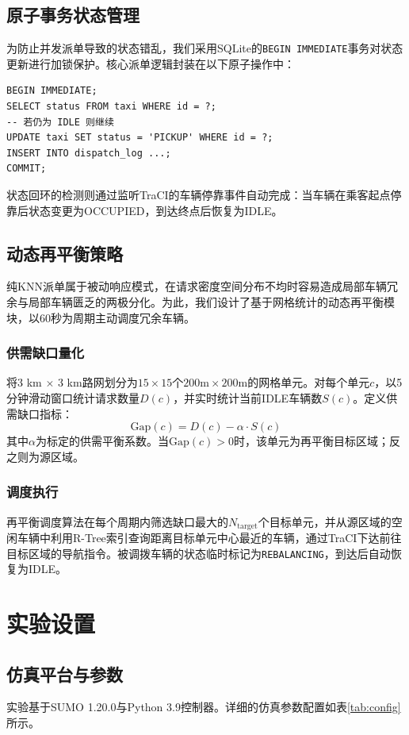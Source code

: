 \documentclass[conference]{IEEEtran}
\begin{document}
\subsection{原子事务状态管理}
为防止并发派单导致的状态错乱，我们采用SQLite的\texttt{BEGIN IMMEDIATE}事务对状态更新进行加锁保护。核心派单逻辑封装在以下原子操作中：
\begin{verbatim}
BEGIN IMMEDIATE;
SELECT status FROM taxi WHERE id = ?;
-- 若仍为 IDLE 则继续
UPDATE taxi SET status = 'PICKUP' WHERE id = ?;
INSERT INTO dispatch_log ...;
COMMIT;
\end{verbatim}
状态回环的检测则通过监听TraCI的车辆停靠事件自动完成：当车辆在乘客起点停靠后状态变更为OCCUPIED，到达终点后恢复为IDLE。

\subsection{动态再平衡策略}
纯KNN派单属于被动响应模式，在请求密度空间分布不均时容易造成局部车辆冗余与局部车辆匮乏的两极分化。为此，我们设计了基于网格统计的动态再平衡模块，以60秒为周期主动调度冗余车辆。

\subsubsection{供需缺口量化}
将3 km $\times$ 3 km路网划分为$15 \times 15$个$200\text{m} \times 200\text{m}$的网格单元。对每个单元$c$，以5分钟滑动窗口统计请求数量$D(c)$，并实时统计当前IDLE车辆数$S(c)$。定义供需缺口指标：
\begin{equation}
\text{Gap}(c) = D(c) - \alpha \cdot S(c)
\end{equation}
其中$\alpha$为标定的供需平衡系数。当$\text{Gap}(c) > 0$时，该单元为再平衡目标区域；反之则为源区域。

\subsubsection{调度执行}
再平衡调度算法在每个周期内筛选缺口最大的$N_{\text{target}}$个目标单元，并从源区域的空闲车辆中利用R-Tree索引查询距离目标单元中心最近的车辆，通过TraCI下达前往目标区域的导航指令。被调拨车辆的状态临时标记为\texttt{REBALANCING}，到达后自动恢复为IDLE。

\section{实验设置}

\subsection{仿真平台与参数}
实验基于SUMO 1.20.0与Python 3.9控制器。详细的仿真参数配置如表\ref{tab:config}所示。
\end{document}
